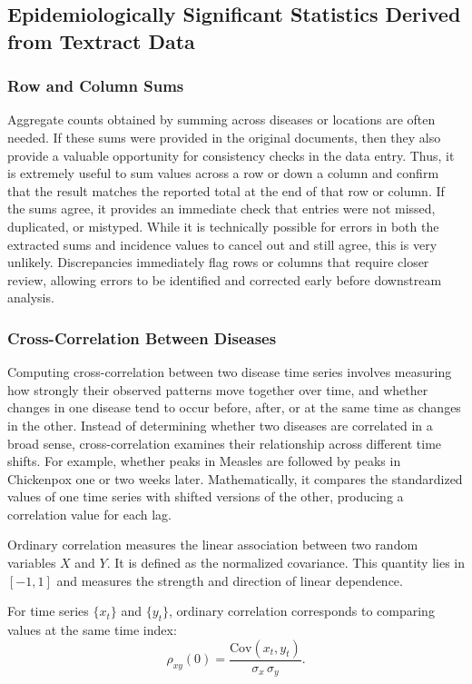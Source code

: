 \documentclass[12pt]{article}
\begin{document}
\subsection{Epidemiologically Significant Statistics Derived from Textract Data}

\subsubsection{Row and Column Sums}
Aggregate counts obtained by summing across diseases or locations are often needed.  If these sums were provided in the original documents, then they also provide a valuable opportunity for consistency checks in the data entry. Thus, it is extremely useful to sum values across a row or down a column and confirm that the result matches the reported total at the end of that row or column. If the sums agree, it provides an immediate check that entries were not missed, duplicated, or mistyped. While it is technically possible for errors in both the extracted sums and incidence values to cancel out and still agree, this is very unlikely. Discrepancies immediately flag rows or columns that require closer review, allowing errors to be identified and corrected early before downstream analysis.

\subsubsection{Cross-Correlation Between Diseases}
Computing cross-correlation between two disease time series involves measuring how strongly their observed patterns move together over time, and whether changes in one disease tend to occur before, after, or at the same time as changes in the other. Instead of determining whether two diseases are correlated in a broad sense, cross-correlation
examines their relationship across different time shifts. For example, whether peaks in Measles are followed by peaks in Chickenpox one or two weeks later. Mathematically, it compares the standardized values of one time series with shifted versions of the other, producing a correlation value for each lag.

Ordinary correlation measures the linear association between two random variables $X$ and $Y$. 
It is defined as the normalized covariance.
This quantity lies in $[-1,1]$ and measures the strength and direction of linear dependence.

For time series $\{x_t\}$ and $\{y_t\}$, ordinary correlation corresponds to comparing values at the same time index:
\[
\rho_{xy}(0) = 
\frac{\mathrm{Cov}(x_t, y_t)}{\sigma_x \, \sigma_y}.
\]
\end{document}

